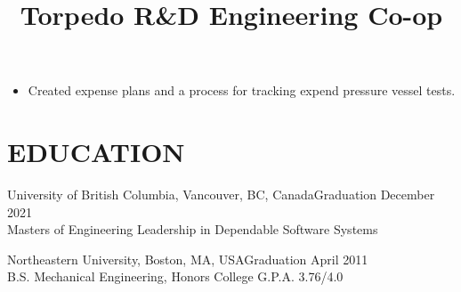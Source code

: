 \documentclass[line]{res}
\begin{document}
\begin{resume}
\title{Torpedo R\&D Engineering Co-op}
\begin {position}
\vspace {-10 pt}
\begin{itemize}
\item Created expense plans and a process for tracking expend
    pressure vessel tests.
\end{itemize}
\end{position}

\section{EDUCATION}
\vspace {2 pt}

University of British Columbia, Vancouver, BC, Canada\hfill Graduation December 2021\\
Masters of Engineering Leadership in Dependable Software Systems \

Northeastern University, Boston, MA, USA\hfill Graduation April 2011 \\
B.S. Mechanical Engineering, Honors College \hfill G.P.A. 3.76/4.0 \

\end{resume}
\end{document}
